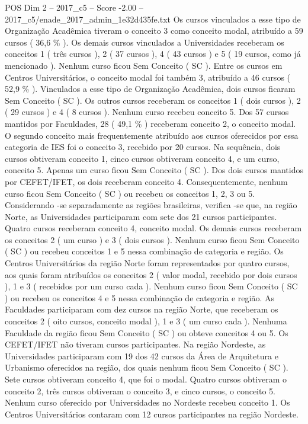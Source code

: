 \begin{textsample}{POS Dim 2 – 2017\_c5 – Score -2.00 – 2017\_c5/enade\_2017\_admin\_1e32d435fe.txt}
Os cursos vinculados a esse tipo de Organização Acadêmica tiveram o conceito 3 como conceito modal, atribuído a 59 cursos ( 36,6 \% ).
Os demais cursos vinculados a Universidades receberam os conceitos 1 ( três cursos ), 2 ( 37 cursos ), 4 ( 43 cursos ) e 5 ( 19 cursos, como já mencionado ).
Nenhum curso ficou Sem Conceito ( SC ).
Entre os cursos em Centros Universitários, o conceito modal foi também 3, atribuído a 46 cursos ( 52,9 \% ).
Vinculados a esse tipo de Organização Acadêmica, dois cursos ficaram Sem Conceito ( SC ).
Os outros cursos receberam os conceitos 1 ( dois cursos ), 2 ( 29 cursos ) e 4 ( 8 cursos ).
Nenhum curso recebeu conceito 5.
Dos 57 cursos mantidos por Faculdades, 28 ( 49,1 \% ) receberam conceito 2, o conceito modal.
O segundo conceito mais frequentemente atribuído aos cursos oferecidos por essa categoria de IES foi o conceito 3, recebido por 20 cursos.
Na sequência, dois cursos obtiveram conceito 1, cinco cursos obtiveram conceito 4, e um curso, conceito 5.
Apenas um curso ficou Sem Conceito ( SC ).
Dos dois cursos mantidos por CEFET/IFET, os dois receberam conceito 4.
Consequentemente, nenhum curso ficou Sem Conceito ( SC ) ou recebeu os conceitos 1, 2, 3 ou 5.
Considerando -se separadamente as regiões brasileiras, verifica -se que, na região Norte, as Universidades participaram com sete dos 21 cursos participantes.
Quatro cursos receberam conceito 4, conceito modal.
Os demais cursos receberam os conceitos 2 ( um curso ) e 3 ( dois cursos ).
Nenhum curso ficou Sem Conceito ( SC ) ou recebeu conceitos 1 e 5 nessa combinação de categoria e região.
Os Centros Universitários da região Norte foram representados por quatro cursos, aos quais foram atribuídos os conceitos 2 ( valor modal, recebido por dois cursos ), 1 e 3 ( recebidos por um curso cada ).
Nenhum curso ficou Sem Conceito ( SC ) ou recebeu os conceitos 4 e 5 nessa combinação de categoria e região.
As Faculdades participaram com dez cursos na região Norte, que receberam os conceitos 2 ( oito cursos, conceito modal ), 1 e 3 ( um curso cada ).
Nenhuma Faculdade da região ficou Sem Conceito ( SC ) ou obteve conceitos 4 ou 5.
Os CEFET/IFET não tiveram cursos participantes.
Na região Nordeste, as Universidades participaram com 19 dos 42 cursos da Área de Arquitetura e Urbanismo oferecidos na região, dos quais nenhum ficou Sem Conceito ( SC ).
Sete cursos obtiveram conceito 4, que foi o modal.
Quatro cursos obtiveram o conceito 2, três cursos obtiveram o conceito 3, e cinco cursos, o conceito 5.
Nenhum curso oferecido por Universidades no Nordeste recebeu conceito 1.
Os Centros Universitários contaram com 12 cursos participantes na região Nordeste.

\end{textsample}
